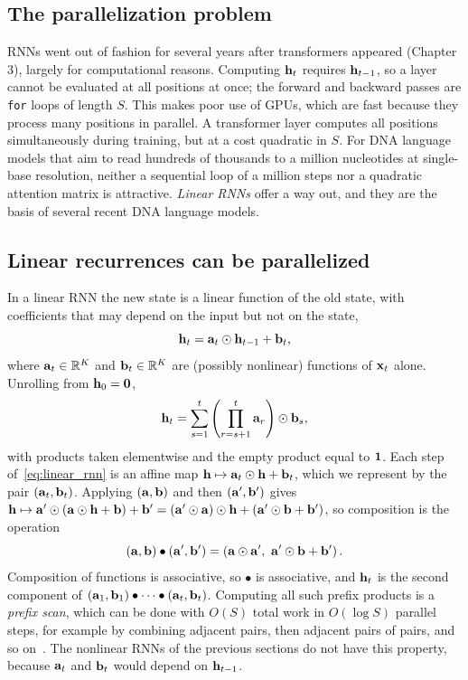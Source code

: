 \subsection{The parallelization problem}

RNNs went out of fashion for several years after transformers appeared (Chapter 3), largely for computational reasons. Computing $\mathbf{h}_t$ requires $\mathbf{h}_{t-1}$, so a layer cannot be evaluated at all positions at once; the forward and backward passes are \texttt{for} loops of length $S$. This makes poor use of GPUs, which are fast because they process many positions in parallel. A transformer layer computes all positions simultaneously during training, but at a cost quadratic in $S$. For DNA language models that aim to read hundreds of thousands to a million nucleotides at single-base resolution, neither a sequential loop of a million steps nor a quadratic attention matrix is attractive. \emph{Linear RNNs} offer a way out, and they are the basis of several recent DNA language models.

\subsection{Linear recurrences can be parallelized}

In a linear RNN the new state is a linear function of the old state, with coefficients that may depend on the input but not on the state,
\begin{equation}
  \mathbf{h}_t = \mathbf{a}_t\odot\mathbf{h}_{t-1} + \mathbf{b}_t ,
  \label{eq:linear_rnn}
\end{equation}
where $\mathbf{a}_t\in\mathbb{R}^K$ and $\mathbf{b}_t\in\mathbb{R}^K$ are (possibly nonlinear) functions of $\mathbf{x}_t$ alone. Unrolling from $\mathbf{h}_0=\mathbf{0}$,
\begin{equation}
  \mathbf{h}_t = \sum_{s=1}^t\left(\prod_{r=s+1}^t\mathbf{a}_r\right)\odot\mathbf{b}_s ,
  \label{eq:linear_unrolled}
\end{equation}
with products taken elementwise and the empty product equal to $\mathbf{1}$. Each step of~\eqref{eq:linear_rnn} is an affine map $\mathbf{h}\mapsto\mathbf{a}_t\odot\mathbf{h}+\mathbf{b}_t$, which we represent by the pair $(\mathbf{a}_t,\mathbf{b}_t)$. Applying $(\mathbf{a},\mathbf{b})$ and then $(\mathbf{a}',\mathbf{b}')$ gives $\mathbf{h}\mapsto\mathbf{a}'\odot(\mathbf{a}\odot\mathbf{h}+\mathbf{b})+\mathbf{b}' = (\mathbf{a}'\odot\mathbf{a})\odot\mathbf{h} + (\mathbf{a}'\odot\mathbf{b}+\mathbf{b}')$, so composition is the operation
\begin{equation}
  (\mathbf{a},\mathbf{b})\bullet(\mathbf{a}',\mathbf{b}') = \left(\mathbf{a}\odot\mathbf{a}',\ \mathbf{a}'\odot\mathbf{b}+\mathbf{b}'\right).
\end{equation}
Composition of functions is associative, so $\bullet$ is associative, and $\mathbf{h}_t$ is the second component of $(\mathbf{a}_1,\mathbf{b}_1)\bullet\cdots\bullet(\mathbf{a}_t,\mathbf{b}_t)$. Computing all such prefix products is a \emph{prefix scan}, which can be done with $O(S)$ total work in $O(\log S)$ parallel steps, for example by combining adjacent pairs, then adjacent pairs of pairs, and so on~\citep{blelloch1990,martin2018}. The nonlinear RNNs of the previous sections do not have this property, because $\mathbf{a}_t$ and $\mathbf{b}_t$ would depend on $\mathbf{h}_{t-1}$.

